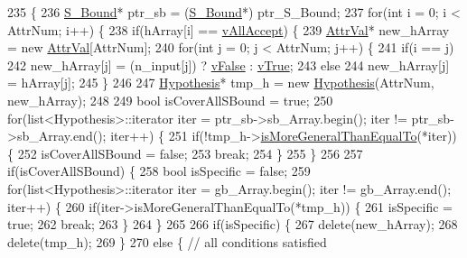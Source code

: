 \begin{DoxyCode}
235                                                                           \{
236     \hyperlink{class_s___bound}{S\_Bound}* ptr\_sb = (\hyperlink{class_s___bound}{S\_Bound}*) ptr\_S\_Bound;
237     \textcolor{keywordflow}{for}(\textcolor{keywordtype}{int} i = 0; i < AttrNum; i++) \{
238     \textcolor{keywordflow}{if}(hArray[i] == \hyperlink{concept_8h_a9680d29b8d997e4adbf99481b65e897da6e098ab4d58e23ef1a840e0a338ef96f}{vAllAccept}) \{
239         \hyperlink{concept_8h_a9680d29b8d997e4adbf99481b65e897d}{AttrVal}* new\_hArray = \textcolor{keyword}{new} \hyperlink{concept_8h_a9680d29b8d997e4adbf99481b65e897d}{AttrVal}[AttrNum];
240         \textcolor{keywordflow}{for}(\textcolor{keywordtype}{int} j = 0; j < AttrNum; j++) \{
241         \textcolor{keywordflow}{if}(i == j)
242             new\_hArray[j] = (n\_input[j]) ? \hyperlink{concept_8h_a9680d29b8d997e4adbf99481b65e897da6abf5f6bc00d14e28def1d3fe93a3d86}{vFalse} : \hyperlink{concept_8h_a9680d29b8d997e4adbf99481b65e897daa93dca41b1b135be638ced74a424f102}{vTrue};
243         \textcolor{keywordflow}{else}
244             new\_hArray[j] = hArray[j];
245         \}
246         
247         \hyperlink{class_hypothesis}{Hypothesis}* tmp\_h = \textcolor{keyword}{new} \hyperlink{class_hypothesis}{Hypothesis}(AttrNum, new\_hArray);
248 
249         \textcolor{keywordtype}{bool} isCoverAllSBound = \textcolor{keyword}{true};
250         \textcolor{keywordflow}{for}(list<Hypothesis>::iterator iter = ptr\_sb->sb\_Array.begin(); iter != ptr\_sb->sb\_Array.end(); 
      iter++) \{
251         \textcolor{keywordflow}{if}(!tmp\_h->\hyperlink{class_hypothesis_ab8d9d311060a302fe11457b067898e24}{isMoreGeneralThanEqualTo}(*iter)) \{
252             isCoverAllSBound = \textcolor{keyword}{false};
253             \textcolor{keywordflow}{break};
254         \}
255         \}
256         
257         \textcolor{keywordflow}{if}(isCoverAllSBound) \{
258         \textcolor{keywordtype}{bool} isSpecific = \textcolor{keyword}{false};
259         \textcolor{keywordflow}{for}(list<Hypothesis>::iterator iter = gb\_Array.begin(); iter != gb\_Array.end(); iter++) \{
260             \textcolor{keywordflow}{if}(iter->isMoreGeneralThanEqualTo(*tmp\_h)) \{
261             isSpecific = \textcolor{keyword}{true};
262             \textcolor{keywordflow}{break};
263             \}
264         \}
265 
266         \textcolor{keywordflow}{if}(isSpecific) \{
267             \textcolor{keyword}{delete}(new\_hArray);
268             \textcolor{keyword}{delete}(tmp\_h);
269         \}
270         \textcolor{keywordflow}{else} \{  \textcolor{comment}{// all conditions satisfied}

\end{DoxyCode}
